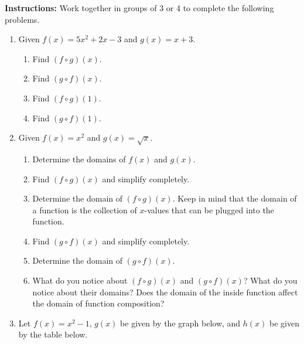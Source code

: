 




\noindent \textbf{Instructions:}  Work together in groups of  3 or 4 to complete the following problems.




\begin{enumerate}
\item Given $f(x)=5x^2+2x-3$ and $g(x)=x+3$.
\begin{enumerate}
\item Find $(f \circ g)(x)$.
\vfill


\item  Find $(g \circ f)(x)$.
\vfill
 
 \item Find $(f \circ g)(1)$.
 \vfill
 
 \item  Find $(g \circ f)(1)$.
 
 \vfill
 \end{enumerate}

\clearpage

\item Given $f(x)=x^2$ and $g(x)=\sqrt{x}$.
\begin{enumerate}
\item Determine the domains of $f(x)$ and $g(x)$.\vfill
\item Find $(f \circ g)(x)$ and simplify completely.\vfill
\item Determine the domain of $(f \circ g)(x)$.  Keep in mind that the domain of a function is the collection of $x$-values that can be plugged into the function.\vfill
\item  Find $(g \circ f)(x)$ and simplify completely.\vfill
\item Determine the domain of $(g \circ f)(x)$.\vfill
\item What do you notice about $(f \circ g)(x)$ and $(g \circ f)(x)$?  What do you notice about their domains?  Does the domain of the inside function affect the domain of function composition?\vfill
\end{enumerate}




\vfill

\clearpage 

\item Let $f(x)=x^2-1$, $g(x)$ be given by the graph below, and $h(x)$ be given by the table below.



\end{enumerate}
